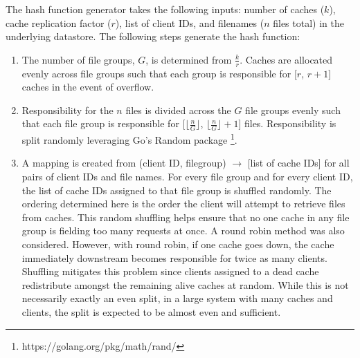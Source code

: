 \documentclass[sigconf]{acmart}
\begin{document}
The hash function generator takes the following inputs: number of caches ($k$), cache replication factor ($r$), list of client IDs, and filenames ($n$ files total) in the  underlying datastore. The following steps generate the hash function:
\begin{enumerate}
\item The number of file groups, $G$, is determined from $\frac{k}{r}$. Caches are allocated evenly across file groups such that each group is responsible for [$r$, $r+1$] caches in the event of overflow.
\item Responsibility for the $n$ files is divided across the $G$ file groups evenly such that each file group is responsible for [$\lfloor\frac{n}{G}\rfloor$, $\lfloor\frac{n}{G}\rfloor +1$] files. Responsibility is split randomly leveraging Go's Random package \footnote{https://golang.org/pkg/math/rand/}.
\item A mapping is created from (client ID, filegroup) $\rightarrow$ [list of cache IDs] for all pairs of client IDs and file names. For every file group and for every client ID, the list of cache IDs assigned to that file group is shuffled randomly. The ordering determined here is the order the client will attempt to retrieve files from caches. This random shuffling helps ensure that no one cache in any file group is fielding too many requests at once. A round robin method was also considered. However, with round robin, if one cache goes down, the cache immediately downstream becomes responsible for twice as many clients. Shuffling mitigates this problem since clients assigned to a dead cache redistribute amongst the remaining alive caches at random. While this is not necessarily exactly an even split, in a large system with many caches and clients, the split is expected to be almost even and sufficient.
\end{enumerate}




\end{document}

